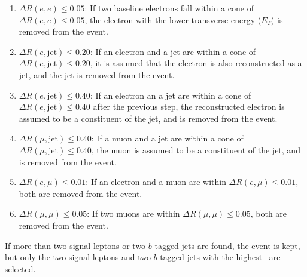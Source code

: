 \begin{enumerate}
  \item $\Delta R(e,e) \le 0.05$: If two baseline electrons fall
    within a cone of $\Delta R(e,e) \le 0.05$, the electron with the
    lower transverse energy ($E_T$) is removed from the event.
  \item $\Delta R(e,\mathrm{jet}) \le 0.20$: If an electron and a jet
    are within a cone of $\Delta R(e,\mathrm{jet}) \le 0.20$, it is
    assumed that the electron is also reconstructed as a jet, and the
    jet is removed from the event.
  \item $\Delta R(e,\mathrm{jet}) \le 0.40$: If an electron an a jet
    are within a cone of $\Delta R(e,\mathrm{jet}) \le 0.40$ after the
    previous step, the reconstructed electron is assumed to be a
    constituent of the jet, and is removed from the event.
  \item $\Delta R(\mu,\mathrm{jet}) \le 0.40$: If a muon and a jet are
    within a cone of $\Delta R(\mu,\mathrm{jet}) \le 0.40$, the muon
    is assumed to be a constituent of the jet, and is removed from the
    event.
  \item $\Delta R(e,\mu) \le 0.01$: If an electron and a muon are
    within $\Delta R(e,\mu) \le 0.01$, both are removed from the
    event.
  \item $\Delta R(\mu,\mu) \le 0.05$: If two muons are within $\Delta
    R(\mu,\mu) \le 0.05$, both are removed from the event.
\end{enumerate}

If more than two signal leptons or two $b$-tagged jets are found, the event is
kept, but only the two signal leptons and two $b$-tagged jets with the highest
\pt\ are selected.

